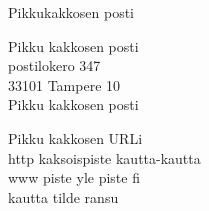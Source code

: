 \begin{song}{Pikkukakkosen posti}
		
	Pikku kakkosen posti\\
	postilokero 347\\
	33101 Tampere 10\\
	Pikku kakkosen posti

	Pikku kakkosen URLi\\
	http kaksoispiste kautta-kautta\\
	www piste yle piste fi\\
	kautta tilde ransu
	
\end{song}
